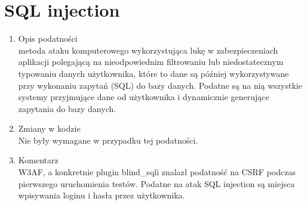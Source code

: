 \section{SQL injection}
\begin{enumerate}
\item Opis podatności\\
 metoda ataku komputerowego wykorzystująca lukę w zabezpieczeniach aplikacji polegającą na nieodpowiednim filtrowaniu lub niedostatecznym typowaniu danych użytkownika, które to dane są później wykorzystywane przy wykonaniu zapytań (SQL) do bazy danych. Podatne są na nią wszystkie systemy przyjmujące dane od użytkownika i dynamicznie generujące zapytania do bazy danych.
\item Zmiany w kodzie\\
Nie były wymagane w przypadku tej podatności.
\item Komentarz\\
W3AF, a konkretnie plugin blind\_sqli znalazł podatność na CSRF podczas pierwszego uruchomienia testów. Podatne na atak SQL injection są miejsca wpisywania loginu i hasła przez użytkownika.
\noindent
\begin{minipage}{\linewidth}
\label{erd}
\end{minipage}
\end{enumerate}



